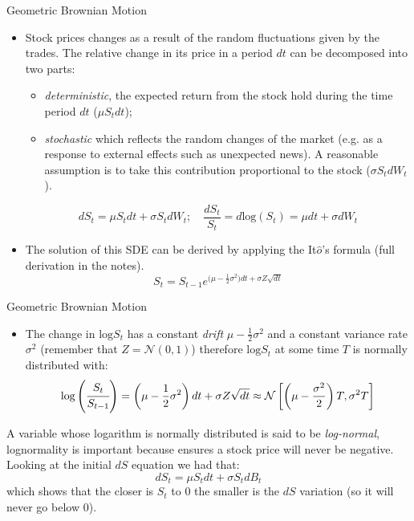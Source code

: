\documentclass{beamer}
\begin{document}
\begin{frame}{Geometric Brownian Motion}
\begin{itemize}
\item Stock prices changes as a result of the random fluctuations given by the trades. The relative change in its price in a period $dt$ can be decomposed into two parts:
\begin{itemize}
    \item \emph{deterministic}, the expected return from the stock hold during the time period $dt$ ($\mu S_tdt$);
    \item \emph{stochastic} which reflects the random changes of the market (e.g. as a response to external effects such as unexpected news). A reasonable assumption is to take this contribution proportional to the stock ($\sigma S_t dW_t$).
\end{itemize}
\begin{equation*}
dS_t = \mu S_tdt + \sigma S_tdW_t;\quad\frac{dS_t}{S_t} = d\textrm{log}(S_t) = \mu dt + \sigma dW_t 
\end{equation*}
\item The solution of this SDE can be derived by applying the It$\hat{o}$'s formula (full derivation in the notes).
\begin{equation*}
S_t = S_{t-1}e^{\big(\mu - \frac{1}{2}\sigma^2\big)dt + \sigma Z\sqrt{dt}}
\end{equation*}
\end{itemize}
\end{frame}

\begin{frame}{Geometric Brownian Motion}
\begin{itemize}
\item The change in $\textrm{log} S_t$ has a constant \emph{drift} $\mu - \frac{1}{2}\sigma^2$ and a constant variance rate $\sigma^2$ (remember that $Z=\mathcal{N}(0,1)$) therefore $\textrm{log} S_t$ at some time $T$ is normally distributed with:
\begin{equation*}
\textrm{log}\left(\cfrac{S_t}{S_{t-1}}\right) = \left(\mu - \frac{1}{2}\sigma^2\right)dt + \sigma Z\sqrt{dt} \approx\mathcal{N}\left[\left(\mu-\frac{\sigma^2}{2}\right)T, \sigma^2 T\right]
\end{equation*}
\end{itemize}
\begin{block}{}
A variable whose logarithm is normally distributed is said to be \emph{log-normal}, lognormality is important because ensures a stock price will never be negative.
Looking at the initial $dS$ equation we had that:
\begin{equation*}
dS_t = \mu S_tdt + \sigma S_tdB_t
\end{equation*}
which shows that the closer is $S_t$ to 0 the smaller is the $dS$ variation (so it will never go below 0).
\end{block}
\end{frame}
\end{document}
